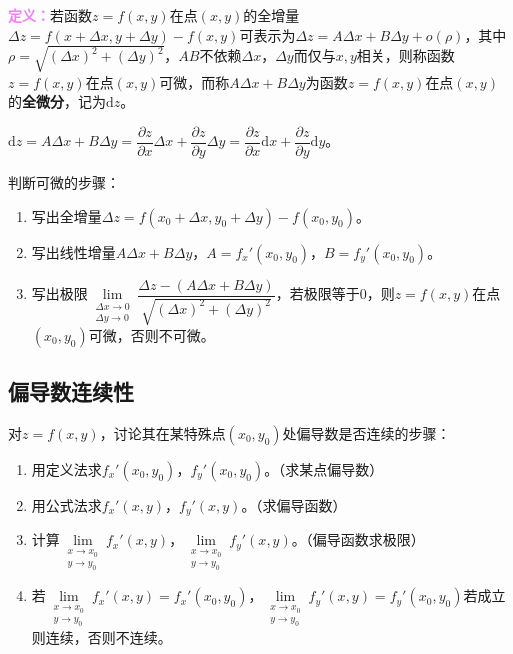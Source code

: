 \documentclass[UTF8, 12pt]{ctexart}
\begin{document}
\textcolor{violet}{\textbf{定义：}}若函数$z=f(x,y)$在点$(x,y)$的全增量$\Delta z=f(x+\Delta x,y+\Delta y)-f(x,y)$可表示为$\Delta z=A\Delta x+B\Delta y+o(\rho)$，其中$\rho=\sqrt{(\Delta x)^2+(\Delta y)^2}$，$AB$不依赖$\Delta x$，$\Delta y$而仅与$x,y$相关，则称函数$z=f(x,y)$在点$(x,y)$可微，而称$A\Delta x+B\Delta y$为函数$z=f(x,y)$在点$(x,y)$的\textbf{全微分}，记为$\textrm{d}z$。

$\textrm{d}z=A\Delta x+B\Delta y=\dfrac{\partial z}{\partial x}\Delta x+\dfrac{\partial z}{\partial y}\Delta y=\dfrac{\partial z}{\partial x}\textrm{d}x+\dfrac{\partial z}{\partial y}\textrm{d}y$。

判断可微的步骤：

\begin{enumerate}
    \item 写出全增量$\Delta z=f(x_0+\Delta x,y_0+\Delta y)-f(x_0,y_0)$。
    \item 写出线性增量$A\Delta x+B\Delta y$，$A=f_x'(x_0,y_0)$，$B=f_y'(x_0,y_0)$。
    \item 写出极限$\lim\limits_{\substack{\Delta x\to0\\\Delta y\to0}}\dfrac{\Delta z-(A\Delta x+B\Delta y)}{\sqrt{(\Delta x)^2+(\Delta y)^2}}$，若极限等于0，则$z=f(x,y)$在点$(x_0,y_0)$可微，否则不可微。
\end{enumerate}



\subsection{偏导数连续性}

对$z=f(x,y)$，讨论其在某特殊点$(x_0,y_0)$处偏导数是否连续的步骤：

\begin{enumerate}
    \item 用定义法求$f_x'(x_0,y_0)$，$f_y'(x_0,y_0)$。（求某点偏导数）
    \item 用公式法求$f_x'(x,y)$，$f_y'(x,y)$。（求偏导函数）
    \item 计算$\lim\limits_{\substack{x\to x_0\\y\to y_0}}f_x'(x,y)$，$\lim\limits_{\substack{x\to x_0\\y\to y_0}}f_y'(x,y)$。（偏导函数求极限）
    \item 若$\lim\limits_{\substack{x\to x_0\\y\to y_0}}f_x'(x,y)=f_x'(x_0,y_0)$，$\lim\limits_{\substack{x\to x_0\\y\to y_0}}f_y'(x,y)=f_y'(x_0,y_0)$若成立则连续，否则不连续。
\end{enumerate}
\end{document}
